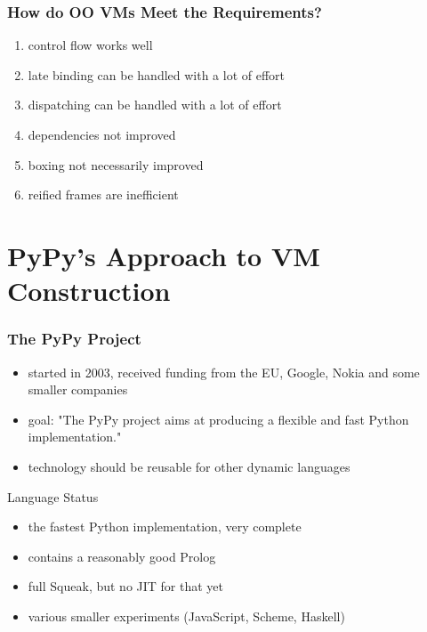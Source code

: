 \documentclass[utf8x]{beamer}
\begin{document}
\begin{frame}
  \frametitle{How do OO VMs Meet the Requirements?}
  \begin{enumerate}
      \item control flow works well
      \item late binding can be handled with a lot of effort
      \item dispatching can be handled with a lot of effort
      \item \alert{dependencies not improved}
      \item \alert{boxing not necessarily improved}
      \item \alert{reified frames are inefficient}
  \end{enumerate}
\end{frame}

\section{PyPy's Approach to VM Construction}


\begin{frame}
  \frametitle{The PyPy Project}
  \begin{itemize}
      \item started in 2003, received funding from the EU, Google, Nokia and some smaller companies
      \item goal: "The PyPy project aims at producing a flexible and fast Python implementation."
      \item technology should be reusable for other dynamic languages
  \end{itemize}
  \pause
  \begin{block}{Language Status}
    \begin{itemize}
        \item the fastest Python implementation, very complete
        \item contains a reasonably good Prolog
        \item full Squeak, but no JIT for that yet
        \item various smaller experiments (JavaScript, Scheme, Haskell)
    \end{itemize}
      
  \end{block}
\end{frame}
\end{document}
